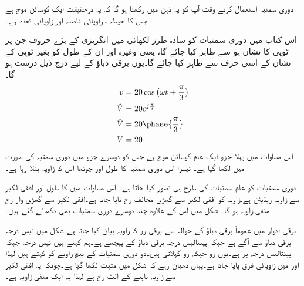 دوری سمتیہ استعمال کرتے وقت آپ کو یہ ذہن میں رکھنا ہو گا کہ یہ درحقیقت ایک کوسائن موج ہے جس کا حیطہ   ، زاویائی فاصلہ   اور زاویائی تعدد  ہے۔

اس کتاب میں دوری سمتیات کو سادہ طرز لکھائی میں انگریزی کے بڑے حروف جن پر ٹوپی کا نشان ہو سے ظاہر کیا جائے گا، یعنی   وغیرہ اور ان کے طول کو بغیر ٹوپی کے نشان کے اسی حرف سے ظاہر کیا جائے گا۔یوں برقی دباؤ  کے لیے درج ذیل درست ہو گا۔
\begin{gather}
\begin{aligned}
v&=20 \cos \big(\omega t +\frac{\pi}{3}\big)\\
\hat{V}&=20 e^{j \frac{\pi}{3}}\\
\hat{V}&=20 \phase{\frac{\pi}{3}}\\
V&=20
\end{aligned}
\end{gather}
اس مساوات میں پہلا جزو ایک عام کوسائن موج ہے جس کو دوسرے جزو میں دوری سمتیہ کی صورت میں لکھا گیا ہے۔ تیسرا اس دوری سمتیہ کا طول اور چوتھا اس کا زاویہ بتلا رہا ہے۔

دوری سمتیات کو عام سمتیات کی طرح ہی تصور کیا جاتا ہے۔ اس مساوات میں  کا طول  اور افقی لکیر سے زاویہ   ریڈیئن ہے۔زاویہ  کو افقی لکیر سے گھڑی  مخالف رخ ناپا جاتا ہے۔افقی لکیر سے گھڑی وار رخ  منفی زاویہ ہو گا۔ شکل  میں اس  کے علاوہ چند دوسرے  دوری سمتیات بھی  دکھائے گئے ہیں۔

برقی ادوار میں عموماً برقی دباؤ  کے حوالہ سے  برقی رو   کا زاویہ بیان کیا جاتا ہے۔شکل    میں  تیس درجہ برقی دباؤ سے آگے ہے جبکہ    پینتالیس درجہ  برقی دباؤ کے  پیچھے  ہے۔ہم کہتے ہیں  تیس درجہ    جبکہ   پینتالیس درجہ   پر ہے۔یوں     رو جبکہ     رو کہلاتی  ہیں۔دو دوری سمتیات کے بیچ زاویے کو  کہتے ہیں لہٰذا  اور  میں   زاویائی فرق پایا جاتا ہے۔یہاں  دھیان رہے کہ شکل  میں   مثبت لکھا گیا ہے۔چونکہ یہ افقی لکیر سے زاویہ ناپنے کے الٹ رخ ہے لہٰذا یہ ایک منفی زاویہ ہے۔

